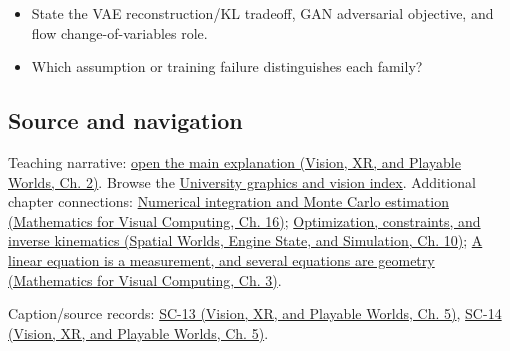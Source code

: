 \begin{itemize}
\tightlist
\item
  State the VAE reconstruction/KL tradeoff, GAN adversarial objective, and flow change-of-variables role.
\item
  Which assumption or training failure distinguishes each family?
\end{itemize}

\subsection{Source and navigation}\label{appendix-2c568f05ee34-source-and-navigation}

Teaching narrative: \href{../07-Vision-XR-and-Playable-Worlds/main.pdf\#nameddest=04-visual-computing-ii-ch031-generative-models-learn-distributions-and-samplers}{open the main explanation (Vision, XR, and Playable Worlds, Ch. 2)}. Browse the \hyperref[appendix-a6d556a4ef50-university-graphics-vision-and-photography---independent-series]{University graphics and vision index}. Additional chapter connections: \href{../02-Mathematics-for-Visual-Computing/main.pdf\#nameddest=03-visual-computing-i-ch012-numerical-integration-and-monte-carlo-estimation}{Numerical integration and Monte Carlo estimation (Mathematics for Visual Computing, Ch. 16)}; \href{../05-Spatial-Worlds-Engine-State-and-Simulation/main.pdf\#nameddest=04-visual-computing-ii-ch029-optimization-constraints-and-inverse-kinematics}{Optimization, constraints, and inverse kinematics (Spatial Worlds, Engine State, and Simulation, Ch. 10)}; \href{../02-Mathematics-for-Visual-Computing/main.pdf\#nameddest=01-foundations-i-ch019-a-linear-equation-is-a-measurement-and-several-equations-are-geometry}{A linear equation is a measurement, and several equations are geometry (Mathematics for Visual Computing, Ch. 3)}.

Caption/source records: \href{../07-Vision-XR-and-Playable-Worlds/main.pdf\#nameddest=04-visual-computing-ii-ch036-sc-13---stanford-cs231n-deep-learning-for-computer-vision-spring-2025-lecture-13-generative-models-1}{SC-13 (Vision, XR, and Playable Worlds, Ch. 5)}, \href{../07-Vision-XR-and-Playable-Worlds/main.pdf\#nameddest=04-visual-computing-ii-ch036-sc-14---stanford-cs231n-deep-learning-for-computer-vision-spring-2025-lecture-14-generative-models-2}{SC-14 (Vision, XR, and Playable Worlds, Ch. 5)}.
